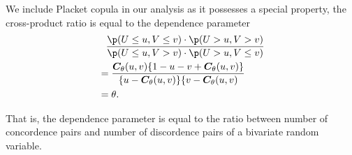 We include Placket copula in our analysis as it possesses a special property,
the cross-product ratio is equal to the dependence parameter
\begin{align}
    &\phantom{=} \frac{\p(U \leq u, V \leq v) \cdot \p(U > u, V > v)}
    {\p(U \leq u, V > v) \cdot \p(U > u, V \leq v)}\nonumber\\
    &= \frac{\bm{C}_\theta(u,v)\{1-u-v+\bm{C}_\theta(u,v)\}}{\{u-\bm{C}_\theta(u,v)\}\{v-\bm{C}_\theta(u,v)}\nonumber\\
    &= \theta.
    \end{align}\medskip

That is, the dependence parameter is equal to the ratio between number of concordence pairs and number of discordence pairs of a bivariate random variable.


